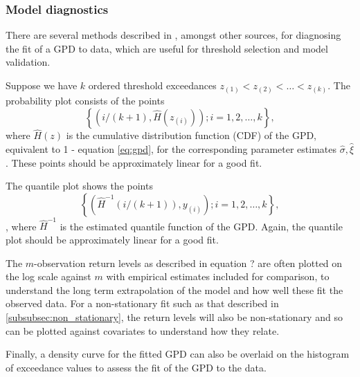 \documentclass{article}
\numberwithin{equation}{section}
\begin{document}
\subsubsection{Model diagnostics} \label{subsubsec:uni_diagnostics}
There are several methods described in \cite{Coles2001}, amongst other sources, for diagnosing the fit of a GPD to data, which are useful for threshold selection and model validation.

Suppose we have $k$ ordered threshold exceedances $z_{(1)} < z_{(2)} < \ldots < z_{(k)}$.
The probability plot consists of the points
\[
  \left\{ \left(i/(k + 1), \hat{H}\left(z_{(i)}\right)\right); i = 1, 2, \ldots, k \right\}, 
\]
where $\hat{H}(z)$ is the cumulative distribution function (CDF) of the GPD, equivalent to 1 - equation \ref{eq:gpd}, for the corresponding parameter estimates $\hat{\sigma}, \hat{\xi}$. 
These points should be approximately linear for a good fit.

The quantile plot shows the points
\[
  \left\{ \left( \hat{H}^{-1}(i/(k+1)) , y_{(i)}\right); i = 1, 2, \ldots, k \right\},
\], 
where $\hat{H}^{-1}$ is the estimated quantile function of the GPD.
Again, the quantile plot should be approximately linear for a good fit.

The $m$-observation return levels as described in equation ? are often plotted on the log scale against $m$ with empirical estimates included for comparison, to understand the long term extrapolation of the model and how well these fit the observed data. 
For a non-stationary fit such as that described in \ref{subsubsec:non_stationary}, the return levels will also be non-stationary and so can be plotted against covariates to understand how they relate.

Finally, a density curve for the fitted GPD can also be overlaid on the histogram of exceedance values to assess the fit of the GPD to the data.

\end{document}
